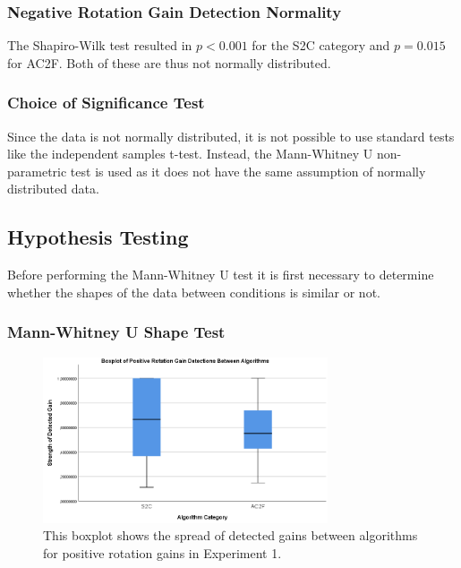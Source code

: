 \subsubsection{Negative Rotation Gain Detection Normality}
The Shapiro-Wilk test resulted in $p < 0.001$ for the S2C category and $p = 0.015$ for AC2F. Both of these are thus not normally distributed.  

\subsubsection{Choice of Significance Test}
Since the data is not normally distributed, it is not possible to use standard tests like the independent samples t-test. Instead, the Mann-Whitney U non-parametric test is used as it does not have the same assumption of normally distributed data. 
   
\subsection{Hypothesis Testing}
Before performing the Mann-Whitney U test it is first necessary to determine whether the shapes of the data between conditions is similar or not. 
\subsubsection{Mann-Whitney U Shape Test}
\begin{figure}[tbph]
    \centering
    \includegraphics[width=0.75\textwidth]{figures/graphs/PosRotationDetectionBoxplot.png}
    \caption[Boxplot on Positive Rotation Detections in Experiment 1]{This boxplot shows the spread of detected gains between algorithms for positive rotation gains in Experiment 1.}
    \label{fig:posRotEx1Boxplot}
\end{figure}

